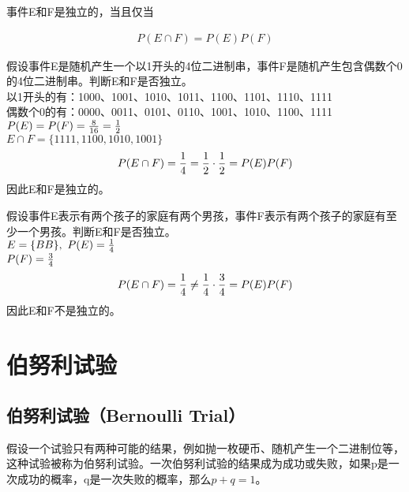 事件E和F是独立的，当且仅当

\vspace{-1cm}

\begin{align}
	P(E \cap F) = P(E)P(F)
\end{align}

\begin{tcolorbox}
	假设事件E是随机产生一个以1开头的4位二进制串，事件F是随机产生包含偶数个0的4位二进制串。判断E和F是否独立。\\
	以1开头的有：1000、1001、1010、1011、1100、1101、1110、1111\\
	偶数个0的有：0000、0011、0101、0110、1001、1010、1100、1111\\
	$ P(E) = P(F) = {8 \over 16} = {1 \over 2} $\\
	$ E \cap F = \{1111, 1100, 1010, 1001\} $
	\begin{align*}
		P(E \cap F)  = {1 \over 4} = {1 \over 2} \cdot {1 \over 2} = P(E)P(F)
	\end{align*}
	因此E和F是独立的。
\end{tcolorbox}

\begin{tcolorbox}
	假设事件E表示有两个孩子的家庭有两个男孩，事件F表示有两个孩子的家庭有至少一个男孩。判断E和F是否独立。\\
	$ E = \{BB\},\ P(E) = {1 \over 4} $\\
	$ P(F) = {3 \over 4} $
	\begin{align*}
		P(E \cap F) = {1 \over 4} \neq {1 \over 4} \cdot {3 \over 4} = P(E)P(F)
	\end{align*}
	因此E和F不是独立的。
\end{tcolorbox}

\newpage

\section{伯努利试验}

\subsection{伯努利试验（Bernoulli Trial）}

假设一个试验只有两种可能的结果，例如抛一枚硬币、随机产生一个二进制位等，这种试验被称为伯努利试验。一次伯努利试验的结果成为成功或失败，如果p是一次成功的概率，q是一次失败的概率，那么$ p + q = 1 $。\\


